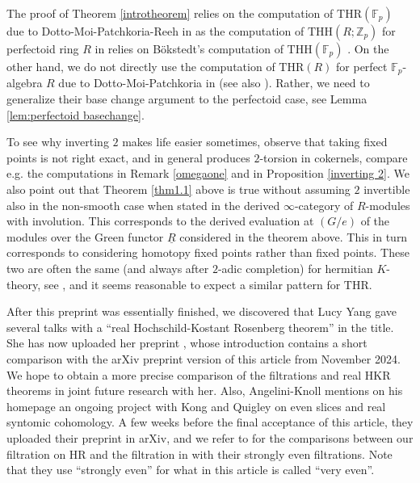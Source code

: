 \documentclass[10pt]{amsart}
\theoremstyle{definition}
\numberwithin{equation}{section}
\newcommand{\F}{\mathbb{F}}
\newcommand{\Z}{\mathbb{Z}}
\newcommand{\ul}{\underline}
\newcommand{\HR}{\mathrm{HR}}
\newcommand{\THH}{\mathrm{THH}}
\newcommand{\THR}{\mathrm{THR}}
\begin{document}
The proof of Theorem \ref{introtheorem} relies on the computation of $\THR(\F_p)$ due to Dotto-Moi-Patchkoria-Reeh in \cite[Theorem 5.15]{DMPR21} as the computation of $\THH(R;\Z_p)$ for perfectoid ring $R$ in \cite[Theorem 6.1]{BMS19} relies on B{\"o}kstedt's computation of $\THH(\F_p)$ \cite{Boekstedt}.
On the other hand,
we do not directly use the computation of $\THR(R)$ for perfect $\F_p$-algebra $R$ due to Dotto-Moi-Patchkoria in \cite[Remark 5.15]{DMP} (see also \cite[Proposition 6.26]{QS22}). Rather, we need to generalize their base change argument to the perfectoid case, see Lemma \ref{lem:perfectoid basechange}.


To see why inverting $2$ makes life easier sometimes, observe that taking fixed points is not right exact, and in general produces $2$-torsion in cokernels, compare  e.g. the computations in Remark \ref{omegaone} and in Proposition \ref{inverting 2}.
We also point out that Theorem \ref{thm1.1} above is true without assuming $2$ invertible also in the non-smooth case when stated in the derived $\infty$-category of $R$-modules with involution. This corresponds to the derived evaluation at $(G/e)$ of the modules over the Green functor $\ul{R}$ considered in the theorem above. This in turn corresponds to considering homotopy fixed points rather than fixed points. These two are often the same (and always after $2$-adic completion) for hermitian $K$-theory, see \cite{BKSO15}, and it seems reasonable to expect a similar pattern for $\THR$.

\medskip

After this preprint was essentially finished, we discovered that Lucy Yang gave several talks with a ``real Hochschild-Kostant Rosenberg theorem'' in the title. She has now uploaded her preprint \cite{Yang}, whose introduction contains a short comparison with the arXiv preprint version of this article from November 2024.
We hope to obtain a more precise comparison of the filtrations and real HKR theorems in joint future research with her.
Also, Angelini-Knoll mentions on his homepage an ongoing project with Kong and Quigley on even slices and real syntomic cohomology. A few weeks before the final acceptance of this article, 
they uploaded their preprint in arXiv,
and we refer to \cite[Theorem 6.7, Proposition 6.8]{AKQ} for the comparisons between our filtration on $\HR$ and the filtration in \cite{Par23} with their strongly even filtrations. Note that they use ``strongly even'' for what in this article is called ``very even''.

\medskip
\end{document}
